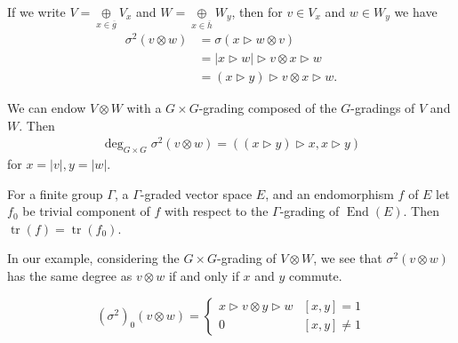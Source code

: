 \documentclass[a4paper, 10pt]{book}
\theoremstyle{definition}
\numberwithin{equation}{chapter}
\newcommand\tr{\operatorname{tr}}
\newcommand\End{\operatorname{End}}
\newcommand\hit{\triangleright}
\newcommand\ot{\otimes}
\begin{document}
If we write $V = \underset{x\in \overline{g}}\oplus V_x$ and $W = \underset{x\in \overline{h}}\oplus W_y$, then for $  v\in V_x$ and $  w\in W_y$ we have
\begin{align*}
  \sigma^2(  v\ot  w)&=\sigma(x\hit   w\ot   v)\\
  &=|x {\hit}  w|\hit   v\ot x\hit   w\\
  &=(x\hit y) \hit   v\ot x\hit  w.
\end{align*}

We can endow $V\ot W$ with a $G\times G$-grading composed of the $G$-gradings of $V$ and $W$. Then
\begin{align*}
  \deg_{G\times G}\sigma^2(v\ot w)=((x\hit y) \hit x,x \hit y)
\end{align*}
for $x=|v|,y=|w|$.

For a finite group $\Gamma$, a $\Gamma$-graded vector space $E$, and an endomorphism $f$ of $E$ let $f_0$ be trivial component of $f$ with respect to the $\Gamma$-grading of $\End(E)$. Then $\tr(f)=\tr(f_0)$.

In our example, considering the $G\times G$-grading of $V\ot W$, we see that $\sigma^2( v\ot  w)$ has the same degree as $v\ot w$ if and only if $x$ and $y$ commute.

\begin{equation} \label{degree condition}
(\sigma^2)_0(v\ot w) = \begin{cases} 
          x\hit v\ot y\hit  w & [x,y]=1 \\
          0 & [x,y] \neq 1 
       \end{cases}
\end{equation}
\end{document}
